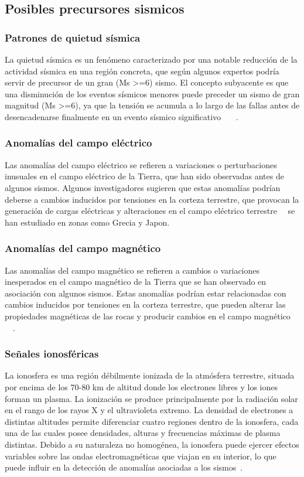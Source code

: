 \subsection{Posibles precursores sismicos}
\subsubsection{Patrones de quietud sísmica }
La quietud sísmica es un fenómeno caracterizado por una notable reducción de la actividad sísmica en una región concreta, que según algunos expertos podría servir de precursor de un gran (Ms >=6) sismo. El concepto subyacente es que una disminución de los eventos sísmicos menores puede preceder un sismo de gran magnitud (Ms >=6), ya que la tensión se acumula a lo largo de las fallas antes de desencadenarse finalmente en un evento sísmico significativo~\cite{SGM}~\cite{mcnally1983seismic}~\cite{wyss1997cannot} \cite{scholz1997whatever}.
\subsubsection{Anomalías del campo eléctrico }
Las anomalías del campo eléctrico se refieren a variaciones o perturbaciones inusuales en el campo eléctrico de la Tierra, que han sido observadas antes de algunos sismos. Algunos investigadores sugieren que estas anomalías podrían deberse a cambios inducidos por tensiones en la corteza terrestre, que provocan la generación de cargas eléctricas y alteraciones en el campo eléctrico terrestre~\cite{varotsos1984physical}~\cite{yepez1995electric} se han estudiado en zonas como Grecia y Japon.
\subsubsection{Anomalías del campo magnético}
Las anomalías del campo magnético se refieren a cambios o variaciones inesperados en el campo magnético de la Tierra que se han observado en asociación con algunos sismos. Estas anomalías podrían estar relacionadas con cambios inducidos por tensiones en la corteza terrestre, que pueden alterar las propiedades magnéticas de las rocas y producir cambios en el campo magnético ~\cite{hayakawa1999fractal}~\cite{hayakawa2007monitoring}.
\subsubsection{Señales ionosféricas}
La ionosfera es una región débilmente ionizada de la atmósfera terrestre, situada por encima de los 70-80 km de altitud donde los electrones libres y los iones forman un plasma. La ionización se produce principalmente por la radiación solar en el rango de los rayos X y el ultravioleta extremo. La densidad de electrones a distintas altitudes permite diferenciar cuatro regiones dentro de la ionosfera, cada una de las cuales posee densidades, alturas y frecuencias máximas de plasma distintas. Debido a su naturaleza no homogénea, la ionosfera puede ejercer efectos variables sobre las ondas electromagnéticas que viajan en su interior, lo que puede influir en la detección de anomalías asociadas a los sismos~\cite{eftaxias2003experience}.

